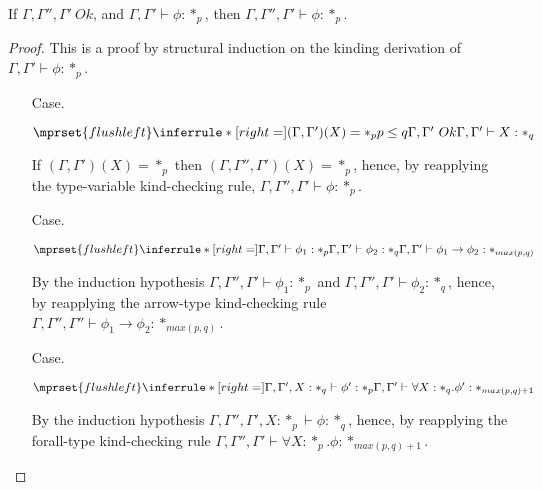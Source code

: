 \begin{lemma}
  If $\Gamma,\Gamma'',\Gamma'\ Ok$, and $\Gamma,\Gamma' \vdash
  \phi:*_p$, then $\Gamma,\Gamma'',\Gamma' \vdash \phi:*_p$.
  \label{lemma:context_weakening_for_kinding_ssf}
\end{lemma}
\begin{proof}
  This is a proof by structural induction on the kinding derivation of 
$\Gamma,\Gamma' \vdash \phi:*_p$.
\begin{itemize}
\item[Case.]\ \\
  \begin{center}
    \begin{math}
      $$\mprset{flushleft}
      \inferrule* [right=] {
        (\Gamma,\Gamma')(X) = *_p
	\\
	p \leq q
	\\
	\Gamma,\Gamma'\ Ok
      }{\Gamma,\Gamma' \vdash X : *_q}
    \end{math}
  \end{center}
  If $(\Gamma,\Gamma')(X) = *_p$ then $(\Gamma,\Gamma'',\Gamma')(X) = *_p$, hence, by 
  reapplying the type-variable kind-checking rule, $\Gamma,\Gamma'',\Gamma' \vdash \phi:*_p$.
\item[Case.]\ \\
  \begin{center}
    \begin{math}
      $$\mprset{flushleft}
      \inferrule* [right=] {
        \Gamma,\Gamma' \vdash \phi_1 : *_p
	\\
	\Gamma,\Gamma' \vdash \phi_2 : *_q
      }{\Gamma,\Gamma' \vdash \phi_1 \rightarrow \phi_2 : *_{max(p,q)}}
    \end{math}
  \end{center}
  By the induction hypothesis $\Gamma,\Gamma'',\Gamma' \vdash \phi_1:*_p$ and 
  $\Gamma,\Gamma'',\Gamma' \vdash \phi_2:*_q$,
  hence, by reapplying the arrow-type kind-checking rule 
  $\Gamma,\Gamma'',\Gamma'' \vdash \phi_1 \rightarrow \phi_2:*_{max(p,q)}$.

\item[Case.]\ \\
  \begin{center}
    \begin{math}
      $$\mprset{flushleft}
      \inferrule* [right=] {
        \Gamma,\Gamma',X : *_q \vdash \phi' : *_p
      }{\Gamma,\Gamma' \vdash \forall X:*_q.\phi' : *_{max(p,q)+1}}
    \end{math}
  \end{center}
  By the induction hypothesis $\Gamma,\Gamma'',\Gamma',X:*_p \vdash \phi:*_q$, hence, by 
  reapplying the forall-type
  kind-checking rule $\Gamma,\Gamma'',\Gamma' \vdash \forall X:*_p.\phi:*_{max(p,q)+1}$.
\end{itemize}
\end{proof}

